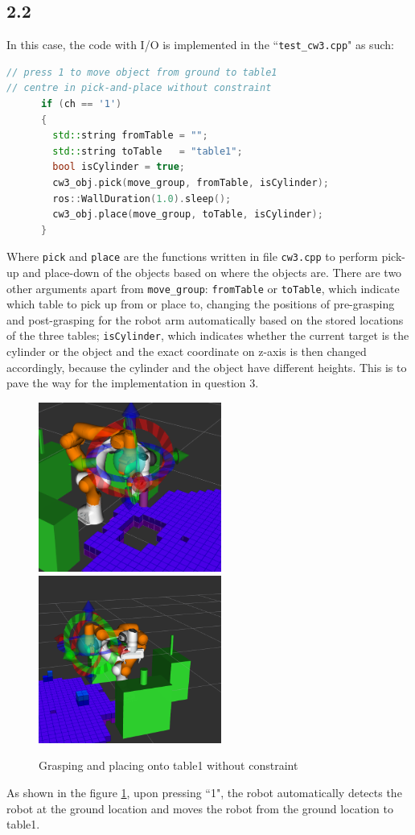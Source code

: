 \documentclass[a4paper,12pt]{article}
\begin{document}
\subsection{2.2}
In this case, the code with I/O is implemented in the ``\texttt{test\_cw3.cpp}" as such:
\begin{lstlisting}[language=C++,
                   directivestyle={\color{black}}
                   emph={int,char,double,float,unsigned},
                   emphstyle={\color{blue}}
                  ]
// press 1 to move object from ground to table1
// centre in pick-and-place without constraint
      if (ch == '1')
      {
        std::string fromTable = "";
        std::string toTable   = "table1";
        bool isCylinder = true;
        cw3_obj.pick(move_group, fromTable, isCylinder);
        ros::WallDuration(1.0).sleep();
        cw3_obj.place(move_group, toTable, isCylinder);
      }
\end{lstlisting}
Where \texttt{pick} and \texttt{place} are the functions written in file \texttt{cw3.cpp} to perform pick-up and place-down of the objects based on where the objects are. There are two other arguments apart from \texttt{move\_group}: \texttt{fromTable} or \texttt{toTable}, which indicate which table to pick up from or place to, changing the positions of pre-grasping and post-grasping for the robot arm automatically based on the stored locations of the three tables; \texttt{isCylinder}, which indicates whether the current target is the cylinder or the object and the exact coordinate on z-axis is then changed accordingly, because the cylinder and the object have different heights. This is to pave the way for the implementation in question 3.
\begin{figure}[H]
    \centering
    \includegraphics[width=6cm]{images/Q2/grasp1.png}
    \includegraphics[width=6cm]{images/Q2/grasp2.png}
    \caption{Grasping and placing onto table1 without constraint}
    \label{fig:q2}
\end{figure}
As shown in the figure \ref{fig:q2}, upon pressing ``1", the robot automatically detects the robot at the ground location and moves the robot from the ground location to table1.
\end{document}
